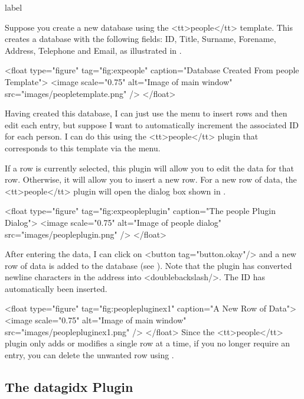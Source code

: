 \begin{example}{label}{}

   Suppose you create a new database using the <tt>people</tt>
   template. This creates a database with the following fields:
   ID, Title, Surname, Forename, Address, Telephone and Email, as
   illustrated in .

     <float type="figure" tag="fig:expeople" caption="Database Created From people Template">
      <image scale="0.75" alt="Image of main window" src="images/peopletemplate.png" />
     </float>

   Having created this database, I can just use the 
    menu to insert rows and then edit each entry,
   but suppose I want to automatically increment the associated ID
   for each person. I can do this using the <tt>people</tt> plugin 
   that corresponds to this template via the  menu.


   If a row is currently selected, this plugin will allow you to edit
   the data for that row. Otherwise, it will allow you to insert a new
   row. For a new row of data, the <tt>people</tt> plugin will open
   the dialog box shown in .

     <float type="figure" tag="fig:expeopleplugin" caption="The people Plugin Dialog">
      <image scale="0.75" alt="Image of people dialog" src="images/peopleplugin.png" />
     </float>

   After entering the data, I can click on <button tag="button.okay"/>
   and a new row of data is added to the database (see 
   ). Note that the plugin has converted newline
   characters in the address into <doublebackslash/>. The ID has automatically 
   been inserted.

     <float type="figure" tag="fig:peoplepluginex1" caption="A New Row of Data">
      <image scale="0.75" alt="Image of main window" src="images/peoplepluginex1.png" />
     </float>
   Since the <tt>people</tt> plugin only adds or modifies a single
   row at a time, if you no longer require an entry, you can delete the
   unwanted row using .
\end{example}

\subsection{The datagidx Plugin}\label{sec:datagidxplugin}

